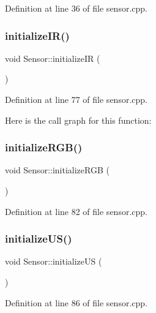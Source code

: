 Definition at line 36 of file sensor.\+cpp.

\mbox{\label{class_sensor_a7065fe2dff6107b89d162e59271a9491}} 
\subsubsection{\texorpdfstring{initialize\+I\+R()}{initializeIR()}}
{\footnotesize\ttfamily void Sensor\+::initialize\+IR (\begin{DoxyParamCaption}{ }\end{DoxyParamCaption})}



Definition at line 77 of file sensor.\+cpp.

Here is the call graph for this function\+:
\mbox{\label{class_sensor_a1684cc490c5dd360890d2c0cdfd23fd3}} 
\subsubsection{\texorpdfstring{initialize\+R\+G\+B()}{initializeRGB()}}
{\footnotesize\ttfamily void Sensor\+::initialize\+R\+GB (\begin{DoxyParamCaption}{ }\end{DoxyParamCaption})}



Definition at line 82 of file sensor.\+cpp.

\mbox{\label{class_sensor_a77a538443f5e024bbd144cc56eed3319}} 
\subsubsection{\texorpdfstring{initialize\+U\+S()}{initializeUS()}}
{\footnotesize\ttfamily void Sensor\+::initialize\+US (\begin{DoxyParamCaption}{ }\end{DoxyParamCaption})}



Definition at line 86 of file sensor.\+cpp.

